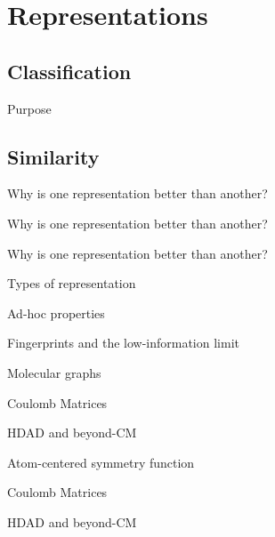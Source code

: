 
\section{Representations}
\subsection{Classification}
\begin{frame}[t]{Purpose}

\end{frame}
%
\subsection{Similarity}
\begin{frame}[t]{Why is one representation better than another?}

\end{frame}
\begin{frame}[t]{Why is one representation better than another?}

\end{frame}
\begin{frame}[t]{Why is one representation better than another?}

\end{frame}
\begin{frame}[t]{Types of representation}

\end{frame}
\begin{frame}[t]{Ad-hoc properties}

\end{frame}
\begin{frame}[t]{Fingerprints and the low-information limit}

\end{frame}
\begin{frame}[t]{Molecular graphs}

\end{frame}
\begin{frame}[t]{Coulomb Matrices}
%
\end{frame}
\begin{frame}[t]{HDAD and beyond-CM}
%
\end{frame}
\begin{frame}{Atom-centered symmetry function}
%
\end{frame}
\begin{frame}{Coulomb Matrices}

\end{frame}
\begin{frame}{HDAD and beyond-CM}

\end{frame}
%

